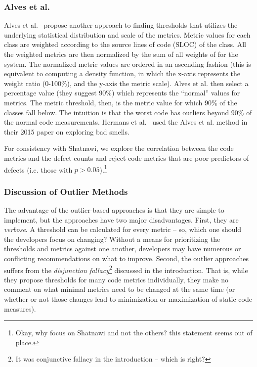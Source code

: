 \documentclass[twocolumn,5p]{elsarticle}
\theoremstyle{break}
\begin{document}
 
\subsubsection{ Alves et al.}
Alves et al.~\cite{Alves2010} propose another approach
to finding thresholds that  utilizes the underlying statistical distribution and scale of the metrics. 
Metric values for each class are weighted according to the source lines of code (SLOC) of the class. All the weighted metrics are then normalized by the sum of all weights of for the system. 
The normalized metric values are ordered in an ascending fashion (this is equivalent to computing a density function, in which the x-axis represents the weight ratio (0-100\%), and the y-axis the metric scale).
Alves et al. then select a percentage value (they suggest 90\%) which represents the ``normal'' values for metrics. The metric threshold, then, is the metric value for which 90\% of the classes fall below. The intuition  is that the worst code has outliers beyond 90\% of the normal code measurements. Hermans et al.~\cite{hermans15} used the
Alves et al. method in their  2015 paper on
exploring bad smells.

For consistency
with Shatnawi, we explore the correlation between
the code metrics and the defect counts and   reject code metrics that are poor predictors of defects (i.e.   those  with $p > 0.05$).\footnote{Okay, why focus on Shatnawi and not the others? this statement seems out of place.}

\subsubsection{Discussion of Outlier Methods}\label{sect:disc}
The advantage of the outlier-based
approaches is that they are simple to implement, but the approaches have   two  major disadvantages. 
First, they are {\em verbose}. A threshold can be calculated for every metric -- so, which one should the developers focus on changing? Without a means for prioritizing the  thresholds and metrics against one another, developers may have numerous or conflicting recommendations on what to improve. Second, the outlier approaches suffers from
the {\em disjunction fallacy}\footnote{It was conjunctive fallacy in the introduction -- which is right?}  discussed in the introduction.
That is, while
 they propose thresholds for many code metrics
individually, they make no comment on what minimal
metrics need to be changed at the same time (or whether or not those
changes lead to minimization or maximization of static code measures).
\end{document}
